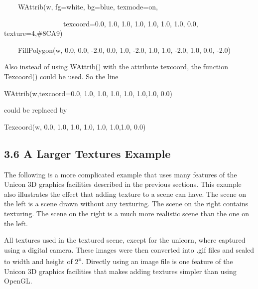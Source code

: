 \documentclass[letterpaper]{article}
\begin{document}
{\bigskip


\bigskip

{\sffamily
\ \ \ \ WAttrib(w, {\textquotedbl}fg=white{\textquotedbl}, {\textquotedbl}bg=blue{\textquotedbl},
{\textquotedbl}texmode=on{\textquotedbl},}

{\sffamily
\ \ \ \ \ \ \ \ \ \ \ \ \ \ \ \ \ {\textquotedbl}texcoord=0.0, 1.0, 1.0, 1.0, 1.0, 1.0, 1.0, 0.0{\textquotedbl},
{\textquotedbl}texture=4,\#8CA9{\textquotedbl})}

{\sffamily
\ \ \ \ FillPolygon(w, 0.0, 0.0, -2.0, 0.0, 1.0, -2.0, 1.0, 1.0, -2.0, 1.0, 0.0, -2.0) }


\bigskip

{
Also instead of using \textsf{WAttrib()} with the attribute \textsf{texcoord}, the function \textsf{Texcoord()} could be
used. So the line }


\bigskip

{\sffamily
WAttrib(w,{\textquotedbl}texcoord=0.0, 1.0, 1.0, 1.0, 1.0, 1.0,1.0, 0.0{\textquotedbl})}


\bigskip

{
could be replaced by }


\bigskip

{\sffamily
Texcoord(w, 0.0, 1.0, 1.0, 1.0, 1.0, 1.0,1.0, 0.0)\newline
}

\subsection[3.6 A Larger Textures Example]{3.6 A Larger Textures Example}

The following is a more complicated example that uses many features of
the Unicon 3D graphics facilities described in the previous
sections. This example also illustrates the effect that adding texture
to a scene can have. The scene on the left is a scene drawn without
any texturing. The scene on the right contains texturing. The scene on
the right is a much more realistic scene than the one on the left.

{
All textures used in the textured scene, except for the unicorn, where captured using a digital camera. These images
were then converted into .gif files and scaled to width and height of 2\textsuperscript{n}. Directly using an image
file is one feature of the Unicon 3D graphics facilities that makes adding textures simpler than using OpenGL. }


}
\end{document}
